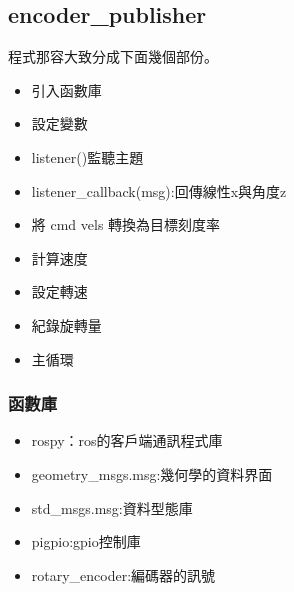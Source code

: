 \subsection{encoder\_publisher}
程式那容大致分成下面幾個部份。
\begin{itemize}
    \item 引入函數庫
    \item 設定變數
    \item listener()監聽主題
    \item listener\_callback(msg):回傳線性x與角度z
    \item 將 cmd vels 轉換為目標刻度率
    \item 計算速度
    \item 設定轉速
    \item 紀錄旋轉量
    \item 主循環
\end{itemize}

\subsubsection{函數庫}

\begin{itemize}
    \item rospy：ros的客戶端通訊程式庫
    \item geometry\_msgs.msg:幾何學的資料界面
    \item std\_msgs.msg:資料型態庫
    \item pigpio:gpio控制庫
    \item rotary\_encoder:編碼器的訊號
\end{itemize}


